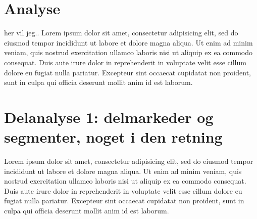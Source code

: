 
\chapter{Analyse \label{analyse_analyse}}

her vil jeg.. Lorem ipsum dolor sit amet, consectetur adipisicing elit, sed do eiusmod
tempor incididunt ut labore et dolore magna aliqua. Ut enim ad minim veniam,
quis nostrud exercitation ullamco laboris nisi ut aliquip ex ea commodo
consequat. Duis aute irure dolor in reprehenderit in voluptate velit esse
cillum dolore eu fugiat nulla pariatur. Excepteur sint occaecat cupidatat non
proident, sunt in culpa qui officia deserunt mollit anim id est laborum. 

\chapter{Delanalyse 1: delmarkeder og segmenter, noget i den retning \label{analyse_deskriptivt}}

Lorem ipsum dolor sit amet, consectetur adipisicing elit, sed do eiusmod
tempor incididunt ut labore et dolore magna aliqua. Ut enim ad minim veniam,
quis nostrud exercitation ullamco laboris nisi ut aliquip ex ea commodo
consequat. Duis aute irure dolor in reprehenderit in voluptate velit esse
cillum dolore eu fugiat nulla pariatur. Excepteur sint occaecat cupidatat non
proident, sunt in culpa qui officia deserunt mollit anim id est laborum.

	
	

